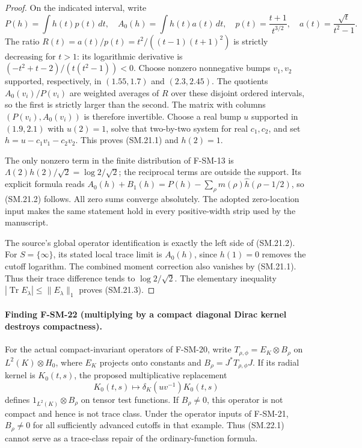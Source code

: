 \begin{proof}
On the indicated interval, write
\[
 P(h)=\int h(t)p(t)\,dt,\quad
 A_0(h)=\int h(t)a(t)\,dt,\quad
 p(t)=\frac{t+1}{t^{3/2}},\quad
 a(t)=\frac{\sqrt t}{t^2-1}.
\]
The ratio
$R(t)=a(t)/p(t)=t^2/((t-1)(t+1)^2)$ is strictly decreasing for
$t>1$: its logarithmic derivative is
$(-t^2+t-2)/(t(t^2-1))<0$.
Choose nonzero nonnegative bumps $v_1,v_2$ supported,
respectively, in $(1.55,1.7)$ and $(2.3,2.45)$.
The quotients $A_0(v_i)/P(v_i)$ are weighted averages of
$R$ over these disjoint ordered intervals, so the first
is strictly larger than the second.  The matrix with
columns $(P(v_i),A_0(v_i))$ is therefore invertible.
Choose a real bump $u$ supported in $(1.9,2.1)$ with
$u(2)=1$, solve that two-by-two system for real $c_1,c_2$,
and set $h=u-c_1v_1-c_2v_2$.  This proves (SM.21.1) and
$h(2)=1$.

The only nonzero term in the finite distribution of F-SM-13 is
$\Lambda(2)h(2)/\sqrt2=\log2/\sqrt2$; the reciprocal terms
are outside the support.  Its explicit formula reads
$A_0(h)+B_1(h)=P(h)-\sum_\rho m(\rho)\widehat h(\rho-1/2)$,
so (SM.21.2) follows.  All zero sums converge absolutely.
The adopted zero-location input makes the same statement
hold in every positive-width strip used by the manuscript.

The source's global operator identification is exactly the
left side of (SM.21.2).  For $S=\{\infty\}$, its stated
local trace limit is $A_0(h)$, since $h(1)=0$ removes the
cutoff logarithm.  The combined moment correction also
vanishes by (SM.21.1).  Thus their trace difference tends
to $\log2/\sqrt2$.  The elementary inequality
$|\operatorname{Tr}E_\lambda|\leq\|E_\lambda\|_1$
proves (SM.21.3).
\end{proof}

\paragraph{Finding F-SM-22 (multiplying by a compact diagonal Dirac kernel destroys compactness).}
For the actual compact-invariant operators of F-SM-20, write
$T_{\rho,\phi}=E_K\otimes B_\rho$ on
$L^2(K)\otimes H_0$, where $E_K$ projects onto constants
and $B_\rho=J^*T_{\rho,\phi}J$.
If its radial kernel is $K_0(t,s)$, the proposed
multiplicative replacement
\[
 K_0(t,s)\longmapsto \delta_K(uv^{-1})K_0(t,s)
 \tag{SM.22.1}
\]
defines $1_{L^2(K)}\otimes B_\rho$ on tensor test functions.
If $B_\rho\ne0$, this operator is not compact and hence
is not trace class.  Under the operator inputs of F-SM-21,
$B_\rho\ne0$ for all sufficiently advanced cutoffs in that
example.  Thus (SM.22.1) cannot serve as a trace-class repair
of the ordinary-function formula.

